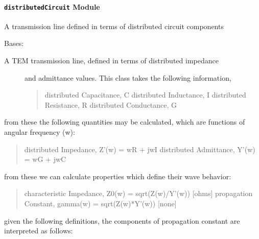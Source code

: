 \documentclass[letterpaper,10pt,english]{sphinxmanual}
\begin{document}
\paragraph{\texttt{distributedCircuit} Module}
\label{api/mwavepy.media:module-mwavepy.media.distributedCircuit}\label{api/mwavepy.media:distributedcircuit-module}
A transmission line defined in terms of distributed circuit components

\begin{fulllineitems}
\label{api/mwavepy.media:mwavepy.media.distributedCircuit.DistributedCircuit}
Bases: {\hyperref[api/mwavepy.media:mwavepy.media.media.Media]{}}
\begin{description}
\item[{A TEM transmission line, defined in terms of  distributed impedance}] \leavevmode
and admittance values. This class takes the following information,
\begin{quote}

distributed Capacitance, C
distributed Inductance, I
distributed Resistance, R
distributed Conductance, G
\end{quote}

\end{description}

from these the following quantities may be calculated, which
are functions of angular frequency (w):
\begin{quote}

distributed Impedance,  Z'(w) = wR + jwI
distributed Admittance, Y'(w) = wG + jwC
\end{quote}

from these we can calculate properties which define their wave 
behavior:
\begin{quote}

characteristic Impedance, Z0(w) = sqrt(Z(w)/Y'(w))              {[}ohms{]}
propagation Constant,   gamma(w) = sqrt(Z(w)*Y'(w))     {[}none{]}
\end{quote}

given the following definitions, the components of propagation 
constant are interpreted as follows:
\begin{quote}


\end{quote}
\end{fulllineitems}
\end{document}
